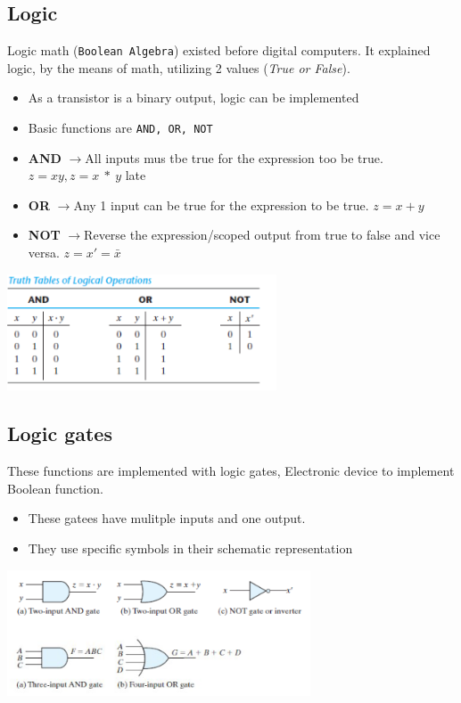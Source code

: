 \documentclass[a4paper,12pt]{article}
\newcommand{\ra}{$\rightarrow$}
\begin{document}
        \subsection*{Logic}
        Logic math (\texttt{Boolean Algebra}) existed before digital computers. It explained logic, by the means of math, utilizing 2 values (\textit{True or False}).
        \begin{itemize}
            \item As a transistor is a binary output, logic can be implemented
            \item Basic functions are \texttt{AND, OR, NOT}
        \end{itemize}
        \hrulefill
        \begin{itemize}
            \item \textbf{AND} \ra All inputs mus tbe true for the expression too be true. $z=xy,z=x~*~y$
           late \item \textbf{OR} \ra Any 1 input can be true for the expression to be true. $z=x+y$
            \item \textbf{NOT} \ra Reverse the expression/scoped output from true to false and vice versa. $z=x'=\bar{x}$
        \end{itemize}
        \begin{center}\includegraphics[width=8cm]{Truth Tables.png}\end{center}

        \subsection*{Logic gates}
            These functions are implemented with logic gates, Electronic device to implement Boolean function.
            \begin{itemize}
                \item These gatees have mulitple inputs and one output.
                \item They use specific symbols in their schematic representation
            \end{itemize}
            \begin{center}\includegraphics[width=9cm]{Logic Gates.png}\end{center}
\end{document}
